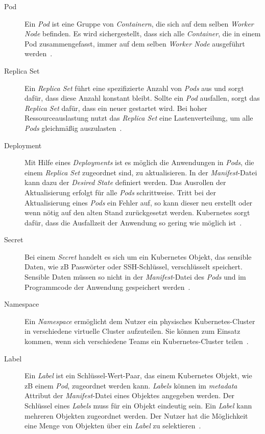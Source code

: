 \begin{description}
      \item[Pod]
            Ein \textit{Pod} ist eine Gruppe von \textit{Containern}, die sich auf dem selben \textit{Worker Node} befinden.
            Es wird sichergestellt, dass sich alle \textit{Container}, die in einem Pod zusammengefasst,
            immer auf dem selben \textit{Worker Node} ausgeführt werden~\cite{kubernetes-objects-kodekloud,kubernetes-in-action-chapter-3}.
      \item[Replica Set]
            Ein \textit{Replica Set} führt eine spezifizierte Anzahl von \textit{Pods} aus und sorgt dafür, dass diese Anzahl konstant bleibt.
            Sollte ein \textit{Pod} ausfallen, sorgt das \textit{Replica Set} dafür, dass ein neuer gestartet wird. Bei hoher Ressourceauslastung
            nutzt das \textit{Replica Set} eine Lastenverteilung, um alle \textit{Pods} gleichmäßig auszulasten~\cite{kubernetes-replica-set-kubematic}.
      \item[Deployment]
            Mit Hilfe eines \textit{Deployments} ist es möglich die Anwendungen in \textit{Pods}, die einem \textit{Replica Set} zugeordnet sind, zu aktualisieren.
            In der \textit{Manifest}-Datei kann dazu der \textit{Desired State} definiert werden.
            Das Ausrollen der Aktualisierung erfolgt für alle \textit{Pods} schrittweise.
            Tritt bei der Aktualisierung eines \textit{Pods} ein Fehler auf, so kann dieser neu erstellt oder wenn nötig auf den alten Stand zurückgesetzt werden.
            Kubernetes sorgt dafür, dass die Ausfallzeit der Anwendung so gering wie möglich ist~\cite{kubernetes-in-action-chapter-9,kubernetes-deployment-vmware}.
      \item[Secret]
            Bei einem \textit{Secret} handelt es sich um ein Kubernetes Objekt, das sensible Daten, wie \ac{zB} Passwörter oder SSH-Schlüssel, verschlüsselt speichert.
            Sensible Daten müssen so nicht in der \textit{Manifest}-Datei des \textit{Pods} und im Programmcode der Anwendung gespeichert werden~\cite{kubernetes-secrets,kubernetes-secrets-medium}.
      \item[Namespace]
            Ein \textit{Namespace} ermöglicht dem Nutzer ein physisches Kubernetes-Cluster in verschiedene virtuelle Cluster aufzuteilen.
            Sie können zum Einsatz kommen, wenn sich verschiedene Teams ein Kubernetes-Cluster teilen~\cite{kubernetes-namespaces-vmware}.
      \item[Label]
            Ein \textit{Label} ist ein Schlüssel-Wert-Paar, das einem Kubernetes Objekt, wie \ac{zB} einem \textit{Pod}, zugeordnet werden kann.
            \textit{Labels} können im \textit{metadata} Attribut der \textit{Manifest}-Datei eines Objektes angegeben werden.
            Der Schlüssel eines \textit{Labels} muss für ein Objekt eindeutig sein. Ein \textit{Label} kann mehreren Objekten zugeordnet werden.
            Der Nutzer hat die Möglichkeit eine Menge von Objekten über ein \textit{Label} zu selektieren~\cite{kubernetes-labels}.
\end{description}


